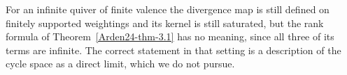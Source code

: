 \begin{remark}\label{Arden24-rem-4.2}
\label{Arden24-rem:infinite}
For an infinite quiver of finite valence the divergence map is still defined on finitely supported weightings and its kernel is still saturated, but the rank formula of Theorem~\ref{Arden24-thm-3.1} has no meaning, since all three of its terms are infinite. The correct statement in that setting is a description of the cycle space as a direct limit, which we do not pursue.
\end{remark}